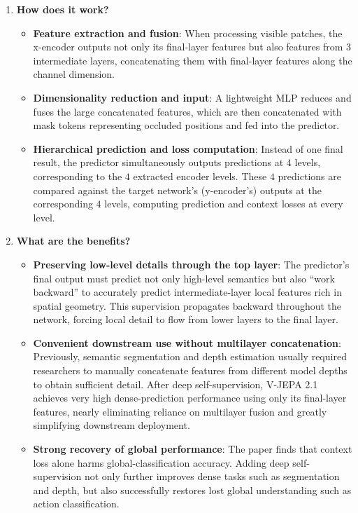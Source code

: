 \begin{enumerate}
\def\labelenumi{\arabic{enumi}.}
\tightlist
\item
  \textbf{How does it work?}

  \begin{itemize}
  \tightlist
  \item
    \textbf{Feature extraction and fusion}: When processing visible patches, the x-encoder outputs not only its final-layer features but also features from \(3\) intermediate layers, concatenating them with final-layer features along the channel dimension.
  \item
    \textbf{Dimensionality reduction and input}: A lightweight MLP reduces and fuses the large concatenated features, which are then concatenated with mask tokens representing occluded positions and fed into the predictor.
  \item
    \textbf{Hierarchical prediction and loss computation}: Instead of one final result, the predictor simultaneously outputs predictions at \(4\) levels, corresponding to the \(4\) extracted encoder levels. These \(4\) predictions are compared against the target network's (y-encoder's) outputs at the corresponding \(4\) levels, computing prediction and context losses at every level.
  \end{itemize}
\item
  \textbf{What are the benefits?}

  \begin{itemize}
  \tightlist
  \item
    \textbf{Preserving low-level details through the top layer}: The predictor's final output must predict not only high-level semantics but also ``work backward'' to accurately predict intermediate-layer local features rich in spatial geometry. This supervision propagates backward throughout the network, forcing local detail to flow from lower layers to the final layer.
  \item
    \textbf{Convenient downstream use without multilayer concatenation}: Previously, semantic segmentation and depth estimation usually required researchers to manually concatenate features from different model depths to obtain sufficient detail. After deep self-supervision, V-JEPA 2.1 achieves very high dense-prediction performance using only its final-layer features, nearly eliminating reliance on multilayer fusion and greatly simplifying downstream deployment.
  \item
    \textbf{Strong recovery of global performance}: The paper finds that context loss alone harms global-classification accuracy. Adding deep self-supervision not only further improves dense tasks such as segmentation and depth, but also successfully restores lost global understanding such as action classification.
  \end{itemize}
\end{enumerate}

